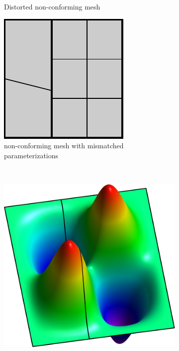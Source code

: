 \begin{figure}[ht]
\begin{subfigure}[t]{0.3\textwidth}
		\caption{Distorted non-conforming mesh}\label{fig:two_patch_biharmonic_problem_distorted}
	\end{subfigure}
	\hfill
	\begin{subfigure}[t]{0.3\textwidth}
		\includegraphics[width=\textwidth]{two_patch_nonmatch}
		\caption{non-conforming mesh with mismatched parameterizations}\label{fig:two_patch_biharmonic_problem_nonmatch}
	\end{subfigure}\\
	\begin{subfigure}[t]{0.35\textwidth}
		\includegraphics[width=\textwidth]{two_patches_solution-plot}


\end{subfigure}
\end{figure}
